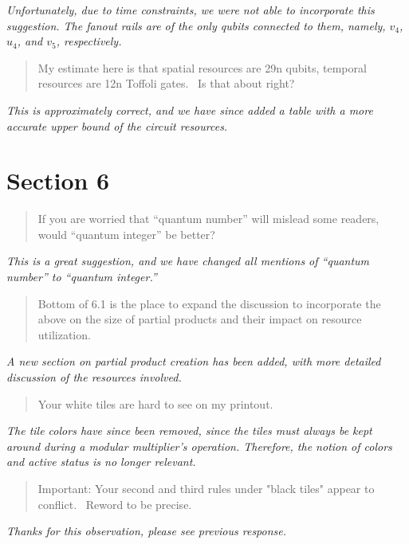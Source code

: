 \documentclass{article}
\theoremstyle{plain} \newtheorem{lemma}{Lemma}
\begin{document}
{\it Unfortunately, due to time constraints, we were not able to incorporate this suggestion.
The fanout rails are of the only qubits connected to them, namely, $v_4$, $u_4$, and $v_5$, respectively.}

\begin{quote}
My estimate here is that spatial resources are 29n qubits, temporal
resources are 12n Toffoli gates.  Is that about right?
\end{quote}

{\it This is approximately correct, and we have since added a table with a more accurate
upper bound of the circuit resources.}

\section{Section 6}

\begin{quote}
If you are worried that ``quantum number'' will mislead some readers,
would ``quantum integer'' be better?
\end{quote}

{\it This is a great suggestion, and we have changed all mentions of ``quantum number'' to
``quantum integer.''}

\begin{quote}
Bottom of 6.1 is the place to expand the discussion to incorporate the
above on the size of partial products and their impact on resource
utilization.
\end{quote}

{\it A new section on partial product creation has been added, with more detailed
discussion of the resources involved.}

\begin{quote}
Your white tiles are hard to see on my printout.
\end{quote}

{\it The tile colors have since been removed, since the tiles must always be kept around
during a modular multiplier's operation. Therefore, the notion of colors and active status is
no longer relevant.}

\begin{quote}
Important: Your second and third rules under "black tiles" appear to
conflict.  Reword to be precise.
\end{quote}

{\it Thanks for this observation, please see previous response.}
\end{document}
